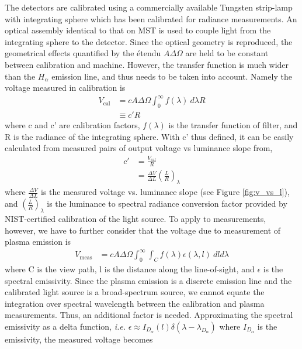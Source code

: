 The detectors are calibrated using a commercially available Tungsten strip-lamp with integrating sphere which has been calibrated for radiance measurements. An optical assembly identical to that on MST is used to couple light from the integrating sphere to the detector. Since the optical geometry is reproduced, the geometrical effects quantified by the {\'e}tendu $A\Delta\Omega$ are held to be constant between calibration and machine. However, the transfer function is much wider than the $H_{\alpha}$ emission line, and thus needs to be taken into account. Namely the voltage measured in calibration is
\begin{align}
    V_{\text{cal}} &= c A \Delta\Omega \int^{\infty}_{0}f(\lambda)\ d\lambda R\\
    &\equiv c'R
\end{align}
where c and c' are calibration factors, $f(\lambda)$ is the transfer function of filter, and R is the radiance of the integrating sphere. With c' thus defined, it can be easily calculated from measured pairs of output voltage vs luminance slope from,
\begin{align}
    c' &= \frac{V_{\text{cal}}}{R}\\
    &= \frac{\Delta V}{\Delta L}\left(\frac{L}{R}\right)_{\lambda}
\end{align}
where $\frac{\Delta V}{\Delta L}$ is the measured voltage vs. luminance slope (see Figure \ref{fig:v_vs_l}), and $(\frac{L}{R})_{\lambda}$ is the luminance to spectral radiance conversion factor provided by NIST-certified calibration of the light source. To apply to measurements, however, we have to further consider that the voltage due to measurement of plasma emission is
\begin{align}
    V_{\text{meas}} &= c A\Delta\Omega\int^{\infty}_0\int_{C} f(\lambda)\epsilon(\lambda,l)\ dld\lambda
\end{align}
where C is the view path, l is the distance along the line-of-sight, and $\epsilon$ is the spectral emissivity. Since the plasma emission is a discrete emission line and the calibrated light source is a broad-spectrum source, we cannot equate the integration over spectral wavelength between the calibration and plasma measurements. Thus, an additional factor is needed. Approximating the spectral emissivity as a delta function, {\em i.e.} $\epsilon\approx I_{D_{\alpha}}(l)\delta(\lambda - \lambda_{D_{\alpha}})$ where $I_{D_\alpha}$ is the emissivity, the measured voltage becomes
